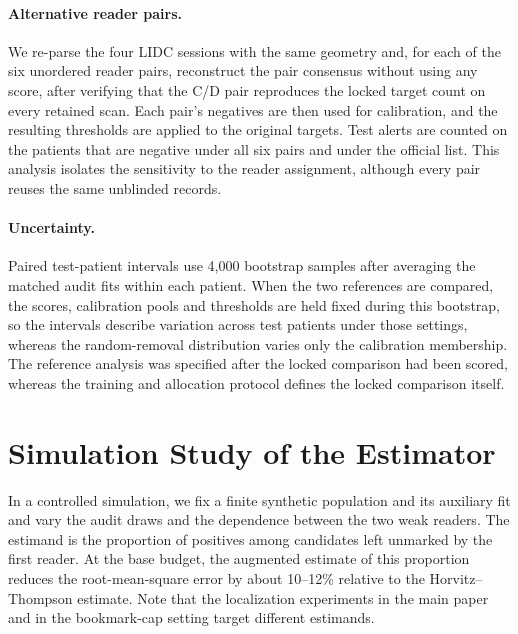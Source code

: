 \paragraph{Alternative reader pairs.}
We re-parse the four LIDC sessions with the same geometry and, for each of the six unordered reader pairs, reconstruct the pair consensus without using any score, after verifying that the C/D pair reproduces the locked target count on every retained scan. Each pair's negatives are then used for calibration, and the resulting thresholds are applied to the original targets. Test alerts are counted on the \RoleTest{} patients that are negative under all six pairs and under the official list. This analysis isolates the sensitivity to the reader assignment, although every pair reuses the same unblinded records.

\paragraph{Uncertainty.}
Paired test-patient intervals use 4,000 bootstrap samples after averaging the matched audit fits within each patient. When the two references are compared, the scores, calibration pools and thresholds are held fixed during this bootstrap, so the intervals describe variation across test patients under those settings, whereas the random-removal distribution varies only the calibration membership. The reference analysis was specified after the locked comparison had been scored, whereas the training and allocation protocol defines the locked comparison itself.

\section{Simulation Study of the Estimator}
\label{sec:s-sim}

In a controlled simulation, we fix a finite synthetic population and its auxiliary fit and vary the audit draws and the dependence between the two weak readers. The estimand is the proportion of positives among candidates left unmarked by the first reader. At the base budget, the augmented estimate of this proportion reduces the root-mean-square error by about 10--12\% relative to the Horvitz--Thompson estimate. Note that the localization experiments in the main paper and in the bookmark-cap setting target different estimands.
